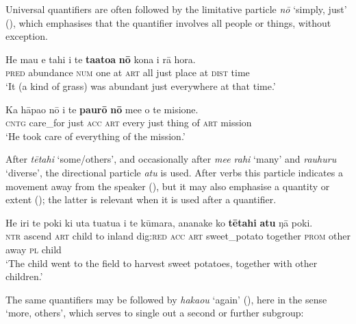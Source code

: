 Universal quantifiers are often followed by the limitative particle \textit{nō} ‘simply, just’ (), which emphasises that the quantifier involves all people or things, without exception.

\ea\label{ex:4.121}
\gll He mau e tahi {\ꞌ}i te \textbf{ta{\ꞌ}ato{\ꞌ}a} \textbf{nō} kona {\ꞌ}i rā hora. \\
\textsc{pred} abundance \textsc{num} one at \textsc{art} all just place at \textsc{dist} time \\

\glt 
‘It (a kind of grass) was abundant just everywhere at that time.’ \textstyleExampleref{[R106.050]} 
\z

\ea\label{ex:4.122}
\gll Ka hāpa{\ꞌ}o nō i te \textbf{paurō} \textbf{nō} me{\ꞌ}e o te misione. \\
\textsc{cntg} care\_for just \textsc{acc} \textsc{art} every just thing of \textsc{art} mission \\

\glt
‘He took care of everything of the mission.’ \textstyleExampleref{[R539-1.067]}
\z

After \textit{tētahi} ‘some/others’, and occasionally after \textit{me{\ꞌ}e rahi} ‘many’ and \textit{rauhuru} ‘diverse’, the directional particle \textit{atu} is used. After verbs this particle indicates a movement away from the speaker (), but it may also emphasise a quantity or extent (); the latter is relevant when it is used after a quantifier.

\ea\label{ex:4.123}
\gll He iri te poki ki {\ꞌ}uta tuatua i te kūmara,  ananake ko \textbf{tētahi} \textbf{atu} ŋā poki.\\
\textsc{ntr} ascend \textsc{art} child to inland dig:\textsc{red} \textsc{acc} \textsc{art} sweet\_potato  together \textsc{prom} other away \textsc{pl} child\\

\glt
‘The child went to the field to harvest sweet potatoes, together with other children.’ \textstyleExampleref{[Mtx-7-25.009]}
\z

The same quantifiers may be followed by \textit{haka{\ꞌ}ou} ‘again’ (), here in the sense ‘more, others’, which serves to single out a second or further subgroup:

